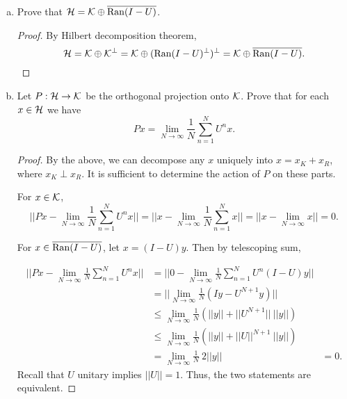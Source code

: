 \begin{itemize}
\begin{enumerate}[(a)]
\item Prove that $\mathcal{H} = \mathcal{K} \oplus \overline{\operatorname{Ran}(I-U)}$.
\begin{proof}
By Hilbert decomposition theorem, 
$$\mathcal{H} = \mathcal{K} \oplus \mathcal{K}^{\perp} = \mathcal{K} \oplus (\operatorname{Ran}(I-U)^{\perp})^{\perp} = \mathcal{K} \oplus \overline{\operatorname{Ran}(I-U)}.$$
\end{proof}

\item Let $P:\mathcal{H} \rightarrow \mathcal{K}$ be the orthogonal projection onto $\mathcal{K}$. Prove that for each $x \in \mathcal{H}$ we have 
$$Px = \lim_{N \rightarrow \infty} \frac{1}{N} \sum_{n=1}^{N} U^n x.$$
\begin{proof}
By the above, we can decompose any $x$ uniquely into $x = x_K + x_R$, where $x_K \perp x_R$. It is sufficient to determine the action of $P$ on these parts.

\medskip 

For $x \in \mathcal{K}$, 
$$||Px - \lim_{N \rightarrow \infty} \frac{1}{N} \sum_{n=1}^{N} U^n x|| = ||x - \lim_{N \rightarrow \infty} \frac{1}{N} \sum_{n=1}^{N} x|| = ||x - \lim_{N \rightarrow \infty} x|| = 0.$$

\medskip 

For $x \in \overline{\operatorname{Ran}(I-U)}$, let $x = (I-U)y$. Then by telescoping sum, 

\begin{align*}
    ||Px - \lim_{N \rightarrow \infty} \frac{1}{N} \sum_{n=1}^{N} U^n x|| &= ||0 - \lim_{N \rightarrow \infty} \frac{1}{N} \sum_{n=1}^{N} U^n (I-U)y|| \\
    &= ||\lim_{N \rightarrow \infty} \frac{1}{N} (Iy - U^{N+1}y)|| \\
    &\leq \lim_{N \rightarrow \infty} \frac{1}{N} (||y|| + ||U^{N+1}|| \ ||y||) \\
    &\leq \lim_{N \rightarrow \infty} \frac{1}{N} (||y|| + ||U||^{N+1} \ ||y||) \\
    &= \lim_{N \rightarrow \infty} \frac{1}{N} \  2||y||
    &= 0.
\end{align*}
Recall that $U$ unitary implies $||U||=1$. Thus, the two statements are equivalent. 
\end{proof}
\end{enumerate}



\end{itemize}
